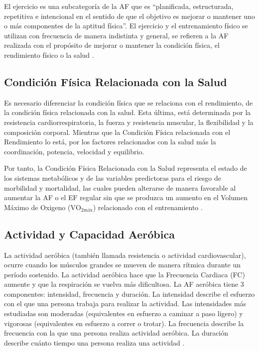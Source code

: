 El ejercicio es una subcategoría de la AF que es ``planificada, estructurada, repetitiva e intencional en el sentido de que el objetivo es mejorar o mantener uno o más componentes de la aptitud física''. El ejercicio y el entrenamiento físico se utilizan con frecuencia de manera indistinta y general, se refieren a la AF realizada con el propósito de mejorar o mantener la condición física, el rendimiento físico o la salud \citep{Caspersen1985}.

\subsection{Condición Física Relacionada con la Salud}
\label{subsec:condicion_fisica}

Es necesario diferenciar la condición física que se relaciona con el rendimiento, de la condición física relacionada con la salud. Esta última, está determinada por la resistencia cardiorrespiratoria, la fuerza y resistencia muscular, la flexibilidad y la composición corporal. Mientras que la Condición Física relacionada con el Rendimiento lo está, por los factores relacionados con la salud más la coordinación, potencia, velocidad y equilibrio.

Por tanto, la Condición Física Relacionada con la Salud representa el estado de los sistemas metabólicos y de las variables predictoras para el riesgo de morbilidad y mortalidad, las cuales pueden alterarse de manera favorable al aumentar la AF o el EF regular sin que se produzca un aumento en el Volumen Máximo de Oxigeno ($\mathrm{VO}_{2\text{máx}}$) relacionado con el entrenamiento \citep{Riebe2018ACSM}.

\subsection{Actividad y Capacidad Aeróbica}
\label{subsec:actividad_capacidad_aerobica}

La actividad aeróbica (también llamada resistencia o actividad cardiovascular), ocurre cuando los músculos grandes se mueven de manera rítmica durante un período sostenido. La actividad aeróbica hace que la Frecuencia Cardiaca (FC) aumente y que la respiración se vuelva más dificultosa. La AF aeróbica tiene 3 componentes: intensidad, frecuencia y duración. La intensidad describe el esfuerzo con el que una persona trabaja para realizar la actividad. Las intensidades más estudiadas son moderadas (equivalentes en esfuerzo a caminar a paso ligero) y vigorosas (equivalentes en esfuerzo a correr o trotar). La frecuencia describe la frecuencia con la que una persona realiza actividad aeróbica. La duración describe cuánto tiempo una persona realiza una actividad \citep{Piercy2018Guidelines}.

